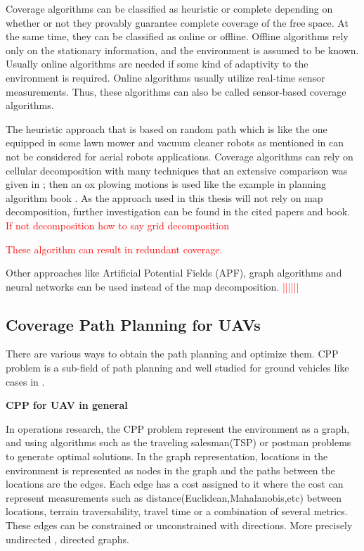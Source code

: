 Coverage algorithms can be classified as heuristic or complete depending on whether or not they provably guarantee complete coverage of the free space. At the same time, they can be classified as online or offline. Offline algorithms rely only on the stationary information, and the environment is assumed to be known. Usually online algorithms are needed if some kind of adaptivity to the environment is required. Online algorithms usually utilize real-time sensor measurements. Thus, these algorithms can also be called sensor-based coverage algorithms.

The heuristic approach that is based on random path which is like the one equipped in some lawn mower and vacuum cleaner robots as mentioned in \cite{CPP1} can not be considered for aerial robots applications. 
Coverage algorithms can rely on cellular decomposition with many techniques that an extensive comparison was given in \cite{CPP2}; then an ox plowing motions is used like the example in planning algorithm book \cite{planningBook}. As the approach used in this thesis will not rely on map decomposition, further investigation can be found in the cited papers and book. \textcolor{red}{ If not decomposition how to say grid decomposition } 


\textcolor{red}{These algorithm can result in redundant coverage.}

Other approaches like  Artificial Potential Fields (APF), graph algorithms and neural networks can be used instead of the map decomposition. \textcolor{red}{||||||}




\subsection{Coverage Path Planning for UAVs}
There are various ways to obtain the path planning and optimize them.
CPP problem is a sub-field of path planning and well studied for ground vehicles like cases in \cite{CPP1,CPP2,path_planning_UGV}.

\textbf{CPP for UAV in general} 

In operations research, the CPP problem represent the environment as a graph, and using algorithms such as the traveling salesman(TSP) or postman problems to generate optimal solutions. In the graph representation, locations in the environment is represented as nodes in the graph and the paths between the locations are the edges. Each edge has a cost assigned to it where the cost can represent measurements such as distance(Euclidean,Mahalanobis,etc) between locations, terrain traversability, travel time or a combination of several metrics. These edges can be constrained or unconstrained with directions. More precisely undirected , directed graphs.

